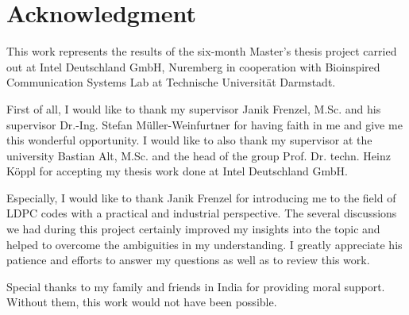 \chapter*{Acknowledgment}
This work represents the results of the six-month Master’s thesis project carried out at Intel Deutschland GmbH, Nuremberg in cooperation with Bioinspired Communication Systems Lab at Technische Universität Darmstadt.

First of all, I would like to thank my supervisor Janik Frenzel, M.Sc. and his supervisor Dr.-Ing. Stefan M\"uller-Weinfurtner for having faith in me and give me this wonderful opportunity. I would like to also thank my supervisor at the university Bastian Alt, M.Sc. and the head of the group Prof. Dr. techn. Heinz K\"oppl for accepting my thesis work done at Intel Deutschland GmbH.

Especially, I would like to thank Janik Frenzel for introducing me to the field of LDPC codes with a practical and industrial perspective. The several discussions we had during this project certainly improved my insights into the topic and helped to overcome the ambiguities in my understanding. I greatly appreciate his patience and efforts to answer my questions as well as to review this work.

Special thanks to my family and friends in India for providing moral support. Without them, this work would not have been possible.



